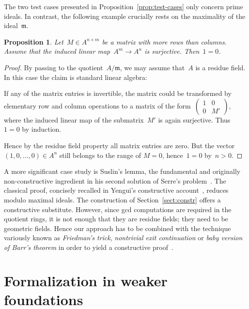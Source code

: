 \documentclass[com,11pt,crcready]{iosart2x}
\theoremstyle{definition}
\theoremstyle{plain}
\newtheorem{proposition}[definition]{Proposition}
\theoremstyle{remark}
\newcommand{\mmm}{\mathfrak{m}}
\renewcommand{\_}{\mathpunct{.}\,}
\begin{document}
The two test cases presented in Proposition~\ref{prop:test-cases} only concern
prime ideals. In contrast, the following example crucially rests on the
maximality of the ideal~$\mmm$.

\begin{proposition}\label{prop:surj-matrix}Let~$M \in A^{n \times m}$ be a matrix with more rows than
columns. Assume that the induced linear map~$A^m \to A^n$ is surjective.
Then~$1 = 0$.
\end{proposition}

\begin{proof}By passing to the quotient~$A/\mmm$, we may assume that~$A$ is a
residue field. In this case the claim is standard linear algebra:

If any of the matrix entries
is invertible, the matrix could be transformed by elementary row and
column operations to a matrix of the form~$\left(\begin{smallmatrix}1 & 0 \\ 0 &
M'\end{smallmatrix}\right)$, where the induced linear map of the submatrix~$M'$ is again
surjective. Thus~$1 = 0$ by induction.

Hence by the residue field property all matrix entries are zero.
But the vector $(1,0,\ldots,0)\in A^n$ still
belongs to the range of $M=0$, hence~$1=0$ by~$n > 0$.
\end{proof}

A more significant case study is Suslin's lemma, the fundamental and originally
non-constructive ingredient in his second solution of Serre's
problem~\cite{suslin:structure}. The classical proof, concisely recalled in
Yengui's constructive account~\cite{yengui:maximal}, reduces modulo
maximal ideals. The construction of Section~\ref{sect:constr} offers a
constructive substitute. However, since gcd computations
are required in the quotient rings, it is not enough that they are residue
fields; they need to be geometric fields. Hence our approach has to be combined
with the technique variously known as \emph{Friedman's trick}, \emph{nontrivial
exit continuation} or \emph{baby version of Barr's theorem} in order to yield a
constructive
proof~\cite{friedman:trick,murthy:classical-proofs,barr:without-points,blechschmidt:generalized-spaces}.


\section{Formalization in weaker foundations}
\label{sect:arithmetization}
\end{document}
